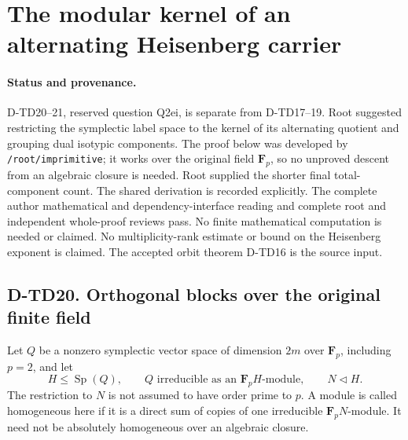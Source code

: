 \section{The modular kernel of an alternating Heisenberg carrier}
\label{sec:heisenberg-modular-kernel}

\paragraph{Status and provenance.}
D-TD20--21, reserved question Q2ei, is separate from D-TD17--19.
Root suggested restricting the symplectic label space to the kernel
of its alternating quotient and grouping dual isotypic components.
The proof below was developed by \texttt{/root/imprimitive}; it works
over the original field \(\mathbf F_p\), so no unproved descent
from an algebraic closure is needed. Root supplied the shorter
final total-component count. The shared derivation is recorded
explicitly. The complete author mathematical and dependency-interface
reading and complete root and independent whole-proof reviews pass. No finite
mathematical computation is needed or claimed.
No multiplicity-rank estimate or bound on the Heisenberg exponent is
claimed. The accepted orbit theorem D-TD16 is the source input.

\subsection*{D-TD20. Orthogonal blocks over the original finite field}

Let \(Q\) be a nonzero symplectic vector space of dimension \(2m\)
over \(\mathbf F_p\), including \(p=2\), and let
\[
 H\le\operatorname{Sp}(Q),\qquad
 Q\text{ irreducible as an }\mathbf F_pH\text{-module},
 \qquad N\triangleleft H.
 \tag{TDI.1}
\]
The restriction to \(N\) is not assumed to have order prime to \(p\).
A module is called homogeneous here if it is a direct sum of copies
of one irreducible \(\mathbf F_pN\)-module. It need not be absolutely
homogeneous over an algebraic closure.

